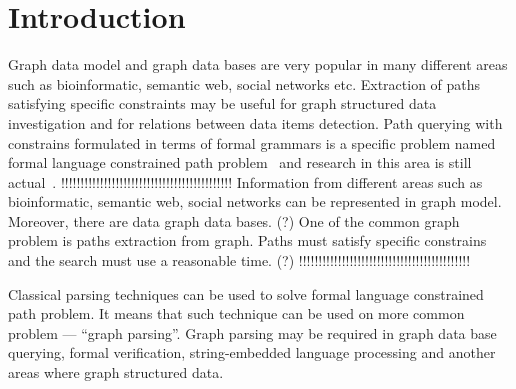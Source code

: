 \documentclass{sig-alternate} %
\begin{document}
\section{Introduction}
Graph data model and graph data bases are very popular in many different areas such as bioinformatic, semantic web, social networks etc.
Extraction of paths satisfying specific constraints may be useful for graph structured data investigation and for relations between data items detection.
Path querying with constrains formulated in terms of formal grammars is a specific problem named formal language constrained path problem~\cite{FLCpathProblem} and research in this area is still actual~\cite{DirOfBigGraphAnalysis}.
!!!!!!!!!!!!!!!!!!!!!!!!!!!!!!!!!!!!!!!!!!!!
Information from different areas such as bioinformatic, semantic web, social networks can be represented in graph model. 
Moreover, there are data graph data bases. (?) One of the common graph problem is paths extraction from graph. 
Paths must satisfy specific constrains and the search must use a reasonable time. (?)     
!!!!!!!!!!!!!!!!!!!!!!!!!!!!!!!!!!!!!!!!!!!!

Classical parsing techniques can be used to solve formal language constrained path problem. 
It means that such technique can be used on more common problem --- ``graph parsing''. 
Graph parsing may be required in graph data base querying, formal verification, string-embedded language processing and another areas where graph structured data. 
\end{document}
